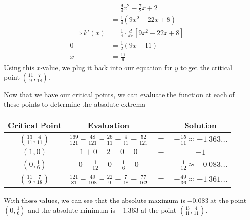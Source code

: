 \documentclass[11pt]{article}
\begin{document}
\begin{enumerate}
{\begin{enumerate}[label=(\(\ell_{\arabic*}\)):]
\begin{align*}
            &= \tfrac{9}{4}x^{2} - \tfrac{7}{2}x + 2 \\
            &= \tfrac{1}{4}(9x^{2} - 22x + 8) \\
            \implies k'(x) &= \tfrac{1}{4} \cdot \tfrac{d}{dx}[9x^{2} - 22x + 8] \\
            0 &= \tfrac{1}{2}(9x - 11) \\
            x &= \tfrac{11}{9} 
          \end{align*}
          Using this \(x\)-value, we plug it back into our equation for \(y\) to get the critical point \(\boxed{\left(\frac{11}{9}, \frac{7}{18}\right)}\).
        \end{enumerate}
        Now that we have our critical points, we can evaluate the function at each of these points to determine the absolute extrema: 
    \begin{multicols}{2}
        \begin{tabular}[htbp]{cccc}
            \toprule
            \textbf{Critical Point} & \textbf{Evaluation} & & \textbf{Solution} \\ \midrule
            \(\left(\frac{13}{11},\frac{4}{11}\right)\) & \(\frac{169}{121} + \frac{48}{121} - \frac{26}{11} - \frac{4}{11} - \frac{52}{121}\) & \(=\) & \(-\frac{15}{11} \approx -1.363\ldots\) \\ \midrule
            \(\left(1,0\right)\) & \(1 + 0 - 2 - 0 - 0\) & \(=\) & \(-1\) \\ \midrule
            \(\left(0, \frac{1}{6}\right)\) & \(0 + \frac{1}{12} - 0 - \frac{1}{6} - 0 \) & \(=\) & \(-\frac{1}{12} \approx - 0.083\ldots\) \\ \midrule
            \(\left(\frac{11}{9}, \frac{7}{18}\right)\) & \(\frac{121}{81} + \frac{49}{108} - \frac{22}{9} - \frac{7}{18} - \frac{77}{162}\) & \(=\) & \(-\frac{49}{36} \approx -1.361\ldots\) \\ \bottomrule
        \end{tabular}

        \flushright
    \end{multicols}
    With these values, we can see that the absolute maximum is \(\boxed{-0.083}\) at the point \(\boxed{\left(0, \frac{1}{6}\right)}\) and the absolute minimum is \(\boxed{-1.363}\) at the point \(\boxed{\left(\frac{13}{11}, \frac{4}{11}\right)}\).

}
\end{enumerate}
\end{document}

